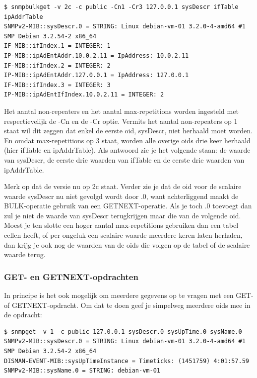 \begin{lstlisting}[float=h, caption={SNMP BULK-opdracht}, label=netsnmp-bulk]
$ snmpbulkget -v 2c -c public -Cn1 -Cr3 127.0.0.1 sysDescr ifTable ipAddrTable
SNMPv2-MIB::sysDescr.0 = STRING: Linux debian-vm-01 3.2.0-4-amd64 #1 SMP Debian 3.2.54-2 x86_64
IF-MIB::ifIndex.1 = INTEGER: 1
IP-MIB::ipAdEntAddr.10.0.2.11 = IpAddress: 10.0.2.11
IF-MIB::ifIndex.2 = INTEGER: 2
IP-MIB::ipAdEntAddr.127.0.0.1 = IpAddress: 127.0.0.1
IF-MIB::ifIndex.3 = INTEGER: 3
IP-MIB::ipAdEntIfIndex.10.0.2.11 = INTEGER: 2
\end{lstlisting}

Het aantal non-repeaters en het aantal max-repetitions worden ingesteld met respectievelijk de -Cn en de -Cr optie.
Vermits het aantal non-repeaters op 1 staat wil dit zeggen dat enkel de eerste \gls{oid}, sysDescr, niet herhaald moet worden.
En omdat max-repetitions op 3 staat, worden alle overige \glspl{oid} drie keer herhaald (hier ifTable en ipAddrTable).
Als antwoord zie je het volgende staan: de waarde van sysDescr, de eerste drie waarden van ifTable en de eerste drie waarden van ipAddrTable.

Merk op dat de versie nu op 2c staat. Verder zie je dat de \gls{oid} voor de scalaire waarde sysDescr nu niet gevolgd wordt door .0,
want achterliggend maakt de BULK-operatie gebruik van een GETNEXT-operatie.
Als je toch .0 toevoegt dan zul je niet de waarde van sysDescr terugkrijgen maar die van de volgende \gls{oid}.
Moest je ten slotte een hoger aantal max-repetitions gebruiken dan een tabel cellen heeft,
of per ongeluk een scalaire waarde meerdere keren laten herhalen, dan krijg je ook nog de waarden van de \glspl{oid} die volgen op de tabel of de scalaire waarde terug.


\subsubsection{GET- en GETNEXT-opdrachten}
\label{meerdere-gegevens-ophalen-met-GET-en-GETNEXT}

In principe is het ook mogelijk om meerdere gegevens op te vragen met een GET- of GETNEXT-opdracht.
Om dat te doen geef je simpelweg meerdere \glspl{oid} mee in de opdracht:

\begin{lstlisting}[float=h, caption={Meerdere gegevens opvragen met SNMP GET}, label=netsnmp-get-meerdere]
$ snmpget -v 1 -c public 127.0.0.1 sysDescr.0 sysUpTime.0 sysName.0
SNMPv2-MIB::sysDescr.0 = STRING: Linux debian-vm-01 3.2.0-4-amd64 #1 SMP Debian 3.2.54-2 x86_64
DISMAN-EVENT-MIB::sysUpTimeInstance = Timeticks: (1451759) 4:01:57.59
SNMPv2-MIB::sysName.0 = STRING: debian-vm-01
\end{lstlisting}

